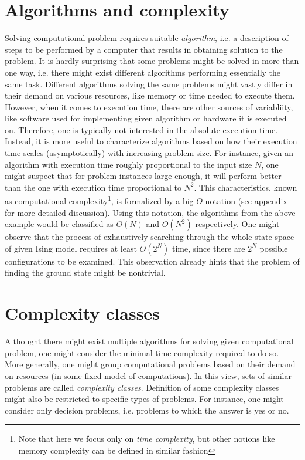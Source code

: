 \section{Algorithms and complexity}
Solving computational problem requires suitable \emph{algorithm}, i.e. a description of steps to be performed by a computer that results in obtaining solution to the problem. It is hardly surprising that some problems might be solved in more than one way, i.e. there might exist different algorithms performing essentially the same task. Different algorithms solving the same problems might vastly differ in their demand on various resources, like memory or time needed to execute them. However, when it comes to execution time, there are other sources of variabliity, like software used for implementing given algorithm or hardware it is executed on. Therefore, one is typically not interested in the absolute execution time. Instead, it is more useful to characterize algorithms based on how their execution time scales (asymptotically) with increasing problem size. For instance, given an algorithm with execution time roughly proportional to the input size $N$, one might suspect that for problem instances large enough, it will perform better than the one with execution time proportional to $N^{2}$. This characteristics, known as computational complexity\footnote{Note that here we focus only on \emph{time complexity}, but other notions like memory complexity can be defined in similar fashion}, is formalized by a big-$O$ notation (see appendix for more detailed discussion). Using this notation, the algorithms from the above example would be classified as $O(N)$ and $O(N^{2})$ respectively. One might observe that the process of exhaustively searching through the whole state space of given Ising model requires at least $O(2^{N})$ time, since there are $2^{N}$ possible configurations to be examined. This observation already hints that the problem of finding the ground state might be nontrivial.

\section{Complexity classes}
Althought there might exist multiple algorithms for solving given computational problem, one might consider the minimal time complexity required to do so. More generally, one might group computational problems based on their demand on resources (in some fixed model of computations). In this view, sets of similar problems are called \emph{complexity classes}. Definition of some complexity classes might also be restricted to specific types of problems. For instance, one might consider only decision problems, i.e. problems to which the answer is yes or no.

